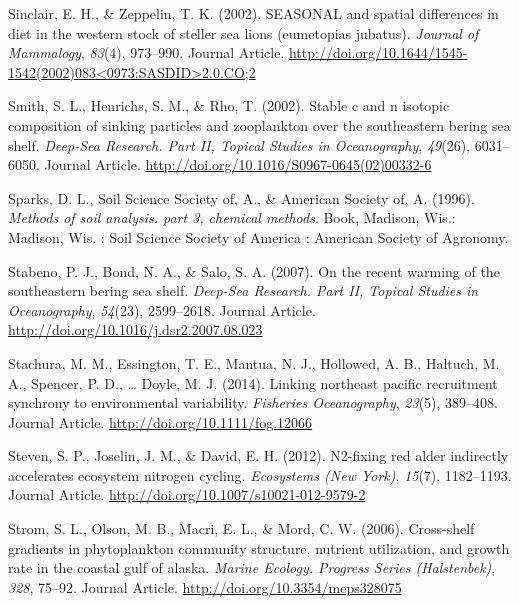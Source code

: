 \documentclass [11pt, proquest] {uwthesis}[2015/03/03]
\begin{document}
\hypertarget{ref-Sinclair2002}{}
Sinclair, E. H., \& Zeppelin, T. K. (2002). SEASONAL and spatial
differences in diet in the western stock of steller sea lions
(eumetopias jubatus). \emph{Journal of Mammalogy}, \emph{83}(4),
973--990. Journal Article.
\href{http://doi.org/10.1644/1545-1542(2002)083\%3C0973:SASDID\%3E2.0.CO;2}{http://doi.org/10.1644/1545-1542(2002)083\textless{}0973:SASDID\textgreater{}2.0.CO;2}

\hypertarget{ref-Smith2002}{}
Smith, S. L., Henrichs, S. M., \& Rho, T. (2002). Stable c and n
isotopic composition of sinking particles and zooplankton over the
southeastern bering sea shelf. \emph{Deep-Sea Research. Part II, Topical
Studies in Oceanography}, \emph{49}(26), 6031--6050. Journal Article.
\url{http://doi.org/10.1016/S0967-0645(02)00332-6}

\hypertarget{ref-Sparks1996}{}
Sparks, D. L., Soil Science Society of, A., \& American Society of, A.
(1996). \emph{Methods of soil analysis. part 3, chemical methods}. Book,
Madison, Wis.: Madison, Wis. : Soil Science Society of America :
American Society of Agronomy.

\hypertarget{ref-Stabeno2007}{}
Stabeno, P. J., Bond, N. A., \& Salo, S. A. (2007). On the recent
warming of the southeastern bering sea shelf. \emph{Deep-Sea Research.
Part II, Topical Studies in Oceanography}, \emph{54}(23), 2599--2618.
Journal Article. \url{http://doi.org/10.1016/j.dsr2.2007.08.023}

\hypertarget{ref-Stachura2014}{}
Stachura, M. M., Essington, T. E., Mantua, N. J., Hollowed, A. B.,
Haltuch, M. A., Spencer, P. D., \ldots{} Doyle, M. J. (2014). Linking
northeast pacific recruitment synchrony to environmental variability.
\emph{Fisheries Oceanography}, \emph{23}(5), 389--408. Journal Article.
\url{http://doi.org/10.1111/fog.12066}

\hypertarget{ref-Perakis2012}{}
Steven, S. P., Joselin, J. M., \& David, E. H. (2012). N2-fixing red
alder indirectly accelerates ecosystem nitrogen cycling.
\emph{Ecosystems (New York)}, \emph{15}(7), 1182--1193. Journal Article.
\url{http://doi.org/10.1007/s10021-012-9579-2}

\hypertarget{ref-Strom2006}{}
Strom, S. L., Olson, M. B., Macri, E. L., \& Mord, C. W. (2006).
Cross-shelf gradients in phytoplankton community structure, nutrient
utilization, and growth rate in the coastal gulf of alaska. \emph{Marine
Ecology. Progress Series (Halstenbek)}, \emph{328}, 75--92. Journal
Article. \url{http://doi.org/10.3354/meps328075}
\end{document}
